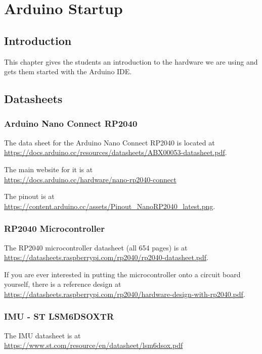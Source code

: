 \chapter{Arduino Startup}

\section{Introduction}
This chapter gives the students an introduction to the hardware we are using and gets them started with 
the Arduino IDE.

\section{Datasheets}
\subsection{Arduino Nano Connect RP2040}
The data sheet for the Arduino Nano Connect RP2040 is located at\\ 
\href{https://docs.arduino.cc/resources/datasheets/ABX00053-datasheet.pdf}{https://docs.arduino.cc/resources/datasheets/ABX00053-datasheet.pdf}.

The main website for it is at \\
\href{https://docs.arduino.cc/hardware/nano-rp2040-connect}{https://docs.arduino.cc/hardware/nano-rp2040-connect}

The pinout is at \\
\href{https://content.arduino.cc/assets/Pinout\_NanoRP2040\_latest.png}{https://content.arduino.cc/assets/Pinout\_NanoRP2040\_latest.png}.

\subsection{RP2040 Microcontroller}
The RP2040 microcontroller datasheet (all 654 pages) is at \\
\href{https://datasheets.raspberrypi.com/rp2040/rp2040-datasheet.pdf}{https://datasheets.raspberrypi.com/rp2040/rp2040-datasheet.pdf}.

If you are ever interested in putting the microcontroller onto a circuit board yourself, there is a reference design at \\
\href{https://datasheets.raspberrypi.com/rp2040/hardware-design-with-rp2040.pdf}{https://datasheets.raspberrypi.com/rp2040/hardware-design-with-rp2040.pdf}.

\subsection{IMU - ST LSM6DSOXTR}
The IMU datasheet is at \\
\href{https://www.st.com/resource/en/datasheet/lsm6dsox.pdf}{https://www.st.com/resource/en/datasheet/lsm6dsox.pdf}

